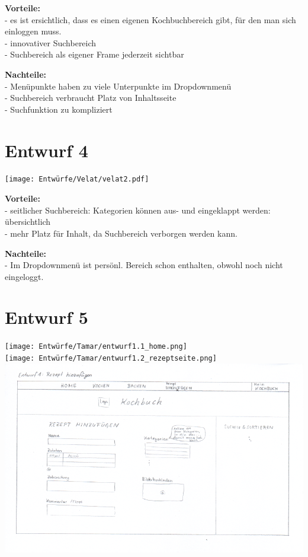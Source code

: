 \documentclass[parskip,10pt,abstracton]{scrartcl}
\begin{document}
\textbf{Vorteile:}\\
- es ist ersichtlich, dass es einen eigenen Kochbuchbereich gibt, für den man sich einloggen muss.\\
- innovativer Suchbereich\\
- Suchbereich als eigener Frame jederzeit sichtbar


\textbf{Nachteile:}\\
- Menüpunkte haben zu viele Unterpunkte im Dropdownmenü\\
- Suchbereich verbraucht Platz von Inhaltsseite\\
- Suchfunktion zu kompliziert

\section*{Entwurf 4} %

\texttt{[image: Entwürfe/Velat/velat2.pdf]}


\textbf{Vorteile:}\\
- seitlicher Suchbereich: Kategorien können aus- und eingeklappt werden: übersichtlich\\
- mehr Platz für Inhalt, da Suchbereich verborgen werden kann.

\textbf{Nachteile:}\\
- Im Dropdownmenü ist persönl. Bereich schon enthalten, obwohl noch nicht eingeloggt.

\newpage
\section*{Entwurf 5} %

\texttt{[image: Entwürfe/Tamar/entwurf1.1\_home.png]}\\
\texttt{[image: Entwürfe/Tamar/entwurf1.2\_rezeptseite.png]}
\includegraphics[scale=1]{Entwürfe/Tamar/entwurf1.3_hinzufügen.png}
\end{document}
